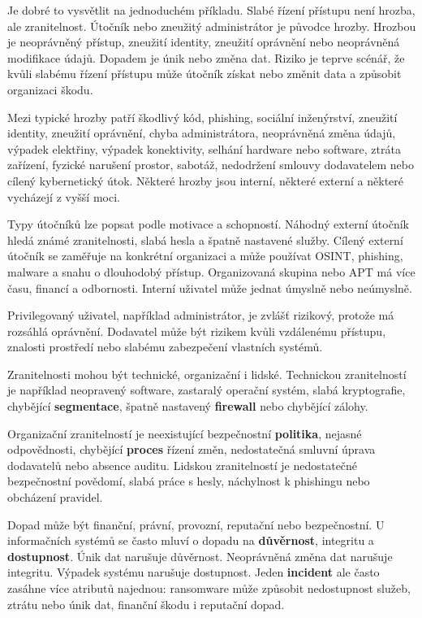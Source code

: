 \documentclass[11pt,a4paper]{article}
\begin{document}
Je dobré to vysvětlit na jednoduchém příkladu. Slabé řízení přístupu není hrozba, ale zranitelnost. Útočník nebo zneužitý administrátor je původce hrozby. Hrozbou je neoprávněný přístup, zneužití identity, zneužití oprávnění nebo neoprávněná modifikace údajů. Dopadem je únik nebo změna dat. Riziko je teprve scénář, že kvůli slabému řízení přístupu může útočník získat nebo změnit data a způsobit organizaci škodu.

Mezi typické hrozby patří škodlivý kód, phishing, sociální inženýrství, zneužití identity, zneužití oprávnění, chyba administrátora, neoprávněná změna údajů, výpadek elektřiny, výpadek konektivity, selhání hardware nebo software, ztráta zařízení, fyzické narušení prostor, sabotáž, nedodržení smlouvy dodavatelem nebo cílený kybernetický útok. Některé hrozby jsou interní, některé externí a některé vycházejí z vyšší moci.

Typy útočníků lze popsat podle motivace a schopností. Náhodný externí útočník hledá známé zranitelnosti, slabá hesla a špatně nastavené služby. Cílený externí útočník se zaměřuje na konkrétní organizaci a může používat OSINT, phishing, malware a snahu o dlouhodobý přístup. Organizovaná skupina nebo APT má více času, financí a odbornosti. Interní uživatel může jednat úmyslně nebo neúmyslně.

Privilegovaný uživatel, například administrátor, je zvlášť rizikový, protože má rozsáhlá oprávnění. Dodavatel může být rizikem kvůli vzdálenému přístupu, znalosti prostředí nebo slabému zabezpečení vlastních systémů.

Zranitelnosti mohou být technické, organizační i lidské. Technickou zranitelností je například neopravený software, zastaralý operační systém, slabá kryptografie, chybějící \textbf{segmentace}, špatně nastavený \textbf{firewall} nebo chybějící zálohy.

Organizační zranitelností je neexistující bezpečnostní \textbf{politika}, nejasné odpovědnosti, chybějící \textbf{proces} řízení změn, nedostatečná smluvní úprava dodavatelů nebo absence auditu. Lidskou zranitelností je nedostatečné bezpečnostní povědomí, slabá práce s hesly, náchylnost k phishingu nebo obcházení pravidel.

Dopad může být finanční, právní, provozní, reputační nebo bezpečnostní. U informačních systémů se často mluví o dopadu na \textbf{důvěrnost}, integritu a \textbf{dostupnost}. Únik dat narušuje důvěrnost. Neoprávněná změna dat narušuje integritu. Výpadek systému narušuje dostupnost. Jeden \textbf{incident} ale často zasáhne více atributů najednou: ransomware může způsobit nedostupnost služeb, ztrátu nebo únik dat, finanční škodu i reputační dopad.
\end{document}
